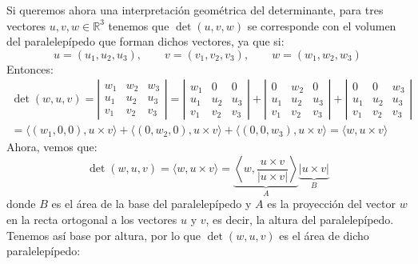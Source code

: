 \noindent
Si queremos ahora una interpretación geométrica del determinante, para tres vectores $u,v,w\in \mathbb{R}^3$ tenemos que $\det(u,v,w)$ se corresponde con el volumen del paralelepípedo que forman dichos vectores, ya que si:
\begin{equation*}
    u = (u_1,u_2,u_3), \qquad v = (v_1,v_2,v_3), \qquad w = (w_1,w_2,w_3)
\end{equation*}
Entonces:
\begin{multline*}
    \det(w,u,v) = \left|\begin{array}{ccc}
        w_1 & w_2 & w_3 \\
        u_1 & u_2 & u_3 \\
        v_1 & v_2 & v_3 
    \end{array}\right| = \left|\begin{array}{ccc}
        w_1 & 0 & 0 \\
        u_1 & u_2 & u_3 \\
        v_1 & v_2 & v_3 
    \end{array}\right| + \left|\begin{array}{ccc}
        0 & w_2 & 0 \\
        u_1 & u_2 & u_3 \\
        v_1 & v_2 & v_3 
    \end{array}\right| + \left|\begin{array}{ccc}
        0 & 0 & w_3 \\
        u_1 & u_2 & u_3 \\
        v_1 & v_2 & v_3 
    \end{array}\right| \\= \langle (w_1,0,0),u\times v \rangle + \langle (0,w_2,0),u\times v \rangle + \langle (0,0,w_3),u\times v \rangle  = \langle w,u\times v \rangle 
\end{multline*}
Ahora, vemos que:
\begin{equation*}
    \det(w,u,v) = \langle w,u\times v \rangle = \underbrace{\left\langle w,\frac{u\times v}{|u\times v|} \right\rangle}_A \underbrace{|u\times v|}_B
\end{equation*}
donde $B$ es el área de la base del paralelepípedo y $A$ es la proyección del vector $w$ en la recta ortogonal a los vectores $u$ y $v$, es decir, la altura del paralelepípedo. Tenemos así base por altura, por lo que $\det(w,u,v)$ es el área de dicho paralelepípedo:


